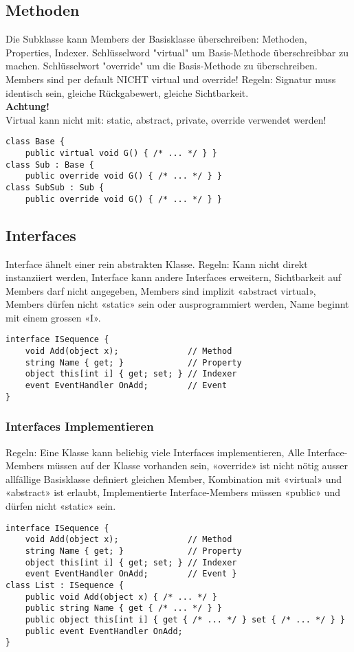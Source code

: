 \subsection{Methoden}
Die Subklasse kann Members der Basisklasse überschreiben: Methoden, Properties, Indexer. Schlüsselword "virtual" um Basis-Methode überschreibbar zu machen. Schlüsselwort "override" um die Basis-Methode zu überschreiben. Members sind per default NICHT virtual und override! Regeln: Signatur muss identisch sein, gleiche Rückgabewert, gleiche Sichtbarkeit. \\
\textbf{Achtung!} \\
Virtual kann nicht mit: static, abstract, private, override verwendet werden!
\begin{lstlisting}
class Base {
	public virtual void G() { /* ... */ } } 
class Sub : Base {
	public override void G() { /* ... */ } } 
class SubSub : Sub {
	public override void G() { /* ... */ } }

\end{lstlisting}

\subsection{Interfaces}
Interface ähnelt einer rein abstrakten Klasse. Regeln: Kann nicht direkt instanziiert werden, Interface kann andere Interfaces erweitern, Sichtbarkeit auf Members darf nicht angegeben, Members sind implizit «abstract virtual», Members dürfen nicht «static» sein oder ausprogrammiert werden, Name beginnt mit einem grossen «I».

\begin{lstlisting}
interface ISequence {
	void Add(object x);              // Method
	string Name { get; }             // Property
	object this[int i] { get; set; } // Indexer
	event EventHandler OnAdd;        // Event 
}
\end{lstlisting}

\subsubsection{Interfaces Implementieren}
Regeln: Eine Klasse kann beliebig viele Interfaces implementieren, Alle Interface-Members müssen auf der Klasse vorhanden sein, «override» ist nicht nötig ausser allfällige Basisklasse definiert gleichen Member, Kombination mit «virtual» und «abstract» ist erlaubt, Implementierte Interface-Members müssen «public» und dürfen nicht «static» sein.
\begin{lstlisting}
interface ISequence {
	void Add(object x);              // Method
	string Name { get; }             // Property
	object this[int i] { get; set; } // Indexer
	event EventHandler OnAdd;        // Event } 
class List : ISequence {
	public void Add(object x) { /* ... */ }
	public string Name { get { /* ... */ } }
	public object this[int i] { get { /* ... */ } set { /* ... */ } }
	public event EventHandler OnAdd; 
}
\end{lstlisting}

\pagebreak